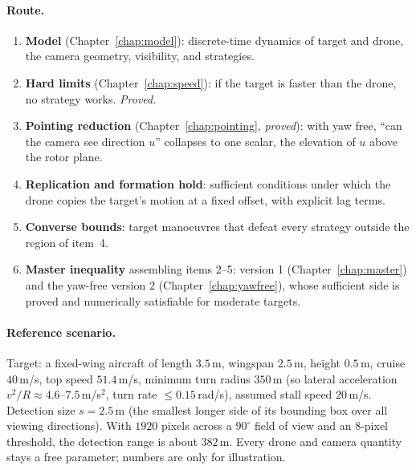\paragraph{Route.}
\begin{enumerate}
  \item \textbf{Model} (Chapter~\ref{chap:model}): discrete-time dynamics of target
        and drone, the camera geometry, visibility, and strategies.
  \item \textbf{Hard limits} (Chapter~\ref{chap:speed}): if the target is faster
        than the drone, no strategy works. \emph{Proved.}
  \item \textbf{Pointing reduction} (Chapter~\ref{chap:pointing}, \emph{proved}): with yaw free, ``can the camera see direction
        $u$'' collapses to one scalar, the elevation of $u$ above the rotor plane.
  \item \textbf{Replication and formation hold}: sufficient conditions under which
        the drone copies the target's motion at a fixed offset, with explicit lag
        terms.
  \item \textbf{Converse bounds}: target manoeuvres that defeat every strategy
        outside the region of item~4.
  \item \textbf{Master inequality} assembling items 2--5: version 1
        (Chapter~\ref{chap:master}) and the yaw-free version 2
        (Chapter~\ref{chap:yawfree}), whose sufficient side is proved and numerically
        satisfiable for moderate targets.
\end{enumerate}

\paragraph{Reference scenario.} Target: a fixed-wing aircraft of length
$3.5$\,m, wingspan $2.5$\,m, height $0.5$\,m, cruise $40$\,m/s, top speed
$51.4$\,m/s, minimum turn radius $350$\,m (so lateral acceleration
$v^2/R \approx 4.6$--$7.5$\,m/s$^2$, turn rate $\le 0.15$\,rad/s), assumed stall
speed $20$\,m/s. Detection size $s = 2.5$\,m (the smallest longer side of its
bounding box over all viewing directions). With $1920$ pixels across a $90^\circ$
field of view and an $8$-pixel threshold, the detection range is about $382$\,m.
Every drone and camera quantity stays a free parameter; numbers are only for
illustration.
